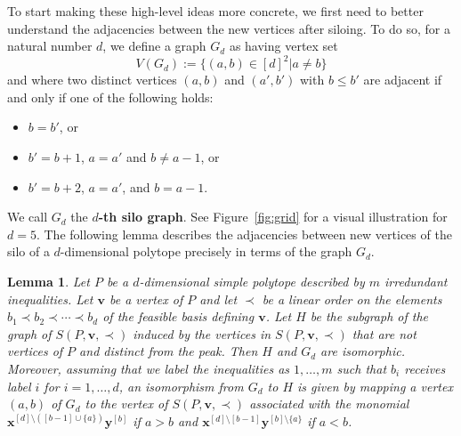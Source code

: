 \documentclass[centering,11pt,reqno]{amsart}
\newtheorem{lem}[theorem]{Lemma}
\theoremstyle{definition}
\begin{document}
To start making these high-level ideas more concrete, we first need to better understand the adjacencies between the new vertices after siloing. To do so, for a natural number $d$, we define a graph $G_d$ as having vertex set
$$V(G_d):=\{(a,b)\in [d]^2|a\neq b\}$$ and where two distinct vertices $(a,b)$ and $(a',b')$ with $b\le b'$ are adjacent if and only if one of the following holds:
\begin{itemize}
    \item $b=b'$, or
    \item $b'=b+1$, $a=a'$ and $b\neq a-1$, or
    \item $b'=b+2$, $a=a'$, and $b=a-1$.
\end{itemize}
We call $G_d$ the \textbf{$d$-th silo graph}. See Figure~\ref{fig:grid} for a visual illustration for $d=5$. The following lemma describes the adjacencies between new vertices of the silo of a $d$-dimensional polytope precisely in terms of the graph $G_d$.
\begin{lem}\label{lem:isomorphism}
Let $P$ be a $d$-dimensional simple polytope described by $m$ irredundant inequalities. Let $\mathbf{v}$ be a vertex of $P$ and let $\prec$ be a linear order on the elements $b_1\prec b_2\prec \cdots\prec b_d$ of the feasible basis defining $\mathbf{v}$. Let $H$ be the subgraph of the graph of $S(P,\mathbf{v},\prec)$ induced by the vertices in $S(P,\mathbf{v},\prec)$ that are not vertices of $P$ and distinct from the peak. Then $H$ and $G_d$ are isomorphic. Moreover, assuming that we label the inequalities as $1,\ldots,m$ such that $b_i$ receives label $i$ for $i=1,\ldots,d$, an isomorphism from $G_d$ to $H$ is given by mapping a vertex $(a,b)$ of $G_d$ to the vertex of $S(P,\mathbf{v},\prec)$ associated with the monomial $\mathbf{x}^{[d]\setminus ([b-1] \cup \{a\})}\mathbf{y}^{[b]}$ if $a>b$ and  $\mathbf{x}^{[d]\setminus [b-1]}\mathbf{y}^{[b]\setminus \{a\}}$ if $a<b$.
\end{lem}
\end{document}
